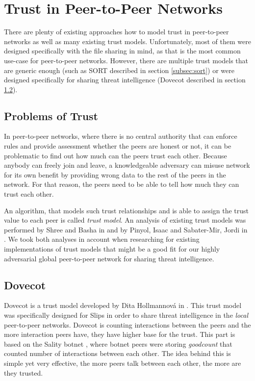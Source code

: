 \section{Trust in Peer-to-Peer Networks}
\label{sec:trust-in-p2p}

There are plenty of existing approaches how to model trust in peer-to-peer networks as well as many existing trust models.
Unfortunately, most of them were designed specifically with the file sharing in mind, as that is the most common use-case for peer-to-peer networks.
However, there are multiple trust models that are generic enough (such as SORT described in section \ref{subsec:sort}) or were designed specifically for sharing threat intelligence (Dovecot described in section \ref{subsec:dovecot}).

\subsection{Problems of Trust}
\label{subsec:problems-of-trust}
In peer-to-peer networks, where there is no central authority that can enforce rules and provide assessment whether the peers are honest or not, it can be problematic to find out how much can the peers trust each other.
Because anybody can freely join and leave, a knowledgeable adversary can misuse network for its own benefit by providing wrong data to the rest of the peers in the network.
For that reason, the peers need to be able to tell how much they can trust each other. 

An algorithm, that models such trust relationships and is able to assign the trust value to each peer is called \textit{trust model}.
An analysis of existing trust models was performed by Shree and Basha in \cite{shree2014exhaustive} and by Pinyol, Isaac and Sabater-Mir, Jordi in \cite{pinyol2013computational}. 
We took both analyses in account when researching for existing implementations of trust models that might be a good fit for our highly adversarial global peer-to-peer network for sharing threat intelligence.

\subsection{Dovecot}
\label{subsec:dovecot}
Dovecot is a trust model developed by Dita Hollmannová in \cite{dita}.
This trust model was specifically designed for Slips in order to share threat intelligence in the \textit{local} peer-to-peer networks.
Dovecot is counting interactions between the peers and the more interaction peers have, they have higher base for the trust.
This part is based on the Sality botnet \cite{falliere2011sality}, where botnet peers were storing \textit{goodcount} that counted number of interactions between each other.
The idea behind this is simple yet very effective, the more peers talk between each other, the more are they trusted.

